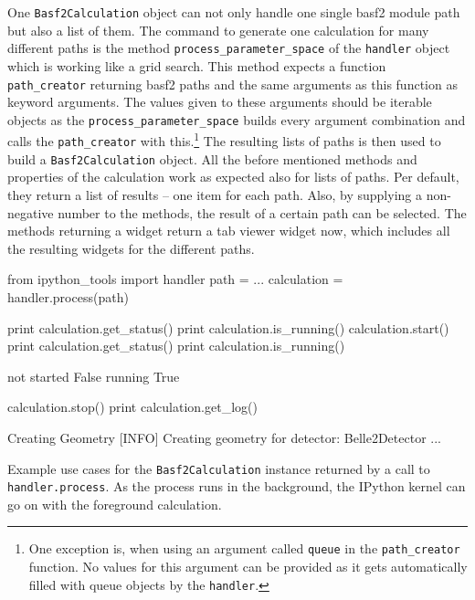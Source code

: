 One \texttt{Basf2Calculation} object can not only handle one single basf2 module path but also a list of them. The command to generate one calculation for many different paths is the method \verb+process_parameter_space+ of the \texttt{handler} object which is working like a grid search. This method expects a function \verb+path_creator+ returning basf2 paths and the same arguments as this function as keyword arguments. The values given to these arguments should be iterable objects as the \verb+process_parameter_space+ builds every argument combination and calls the \verb+path_creator+ with this.\footnote{One exception is, when using an argument called \texttt{queue} in the \texttt{path\_creator} function. No values for this argument can be provided as it gets automatically filled with queue objects by the \texttt{handler}.} The resulting lists of paths is then used to build a \texttt{Basf2Calculation} object. All the before mentioned methods and properties of the calculation work as expected also for lists of paths. Per default, they return a list of results -- one item for each path. Also, by supplying a non-negative number to the methods, the result of a certain path can be selected. The methods returning a widget return a tab viewer widget now, which includes all the resulting widgets for the different paths.

\begin{listing}
\begin{inputipynb}
from ipython_tools import handler
path = ...
calculation = handler.process(path)
\end{inputipynb}
\begin{inputipynb}
print calculation.get_status()
print calculation.is_running()
calculation.start()
print calculation.get_status()
print calculation.is_running()
\end{inputipynb}
\begin{outputipynb}
not started
False
running
True
\end{outputipynb}
\begin{inputipynb}
calculation.stop()
print calculation.get_log()
\end{inputipynb}
\begin{outputipynb}[\theipythcntr]
[INFO] Creating Geometry
[INFO] Creating geometry for detector: Belle2Detector
...
\end{outputipynb}

  \caption[Example use cases for the Basf2Calculation objects.]{Example use cases for the \texttt{Basf2Calculation} instance returned by a call to \texttt{handler.process}. As the process runs in the background, the IPython kernel can go on with the foreground calculation.}
  \label{lis-calculation}
\end{listing}

